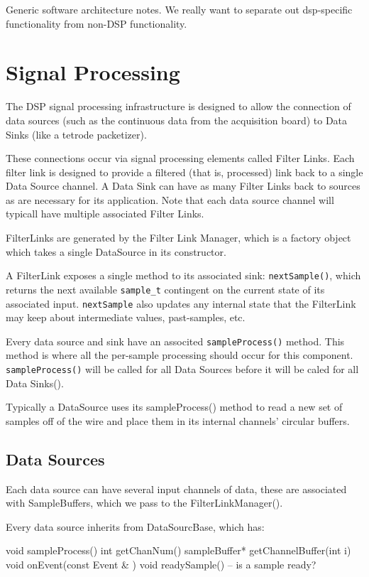 Generic software architecture notes. We really want to separate out
dsp-specific functionality from non-DSP functionality.


\section{Signal Processing}

The DSP signal processing infrastructure is designed to allow the
connection of data sources (such as the continuous data from the
acquisition board) to Data Sinks (like a tetrode packetizer).

These connections occur via signal processing elements called Filter
Links. Each filter link is designed to provide a filtered (that is,
processed) link back to a single Data Source channel.  A Data Sink can
have as many Filter Links back to sources as are necessary for its
application. Note that each data source channel will typicall have
multiple associated Filter Links.

FilterLinks are generated by the Filter Link Manager, which is a
factory object which takes a single DataSource in its
constructor.

A FilterLink exposes a single method to its associated sink:
\texttt{nextSample()}, which returns the next available
\texttt{sample\_t} contingent on the current state of its associated
input.  \texttt{nextSample} also updates any internal state that the
FilterLink may keep about intermediate values, past-samples, etc.

Every data source and sink have an associted \texttt{sampleProcess()}
method.  This method is where all the per-sample processing should
occur for this component. \texttt{sampleProcess()} will be called for
all Data Sources before it will be caled for all Data Sinks().

Typically a DataSource uses its sampleProcess() method to read a new
set of samples off of the wire and place them in its internal
channels' circular buffers.

\subsection{Data Sources}
Each data source can have several input channels of data, these are
associated with SampleBuffers, which we pass to the
FilterLinkManager().

Every data source inherits from DataSourcBase, which has:

void sampleProcess()
int getChanNum()
sampleBuffer* getChannelBuffer(int i)
void onEvent(const Event & )
void readySample() -- is a sample ready? 


